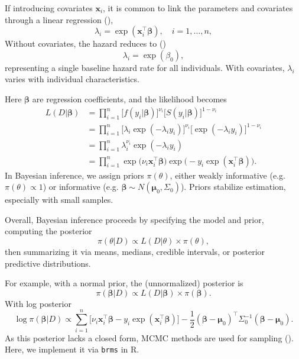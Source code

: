 If introducing covariates $\mathbf{x}_i$, it is common to link the parameters and covariates through a linear regression (\cite{ibrahim2013bayesian}),
$$
\lambda_i = \exp(\mathbf{x}_i^\top \boldsymbol{\beta}),
\quad i = 1, \ldots, n,
$$
Without covariates, the hazard reduces to (\cite{chen2025survival})
$$
\lambda_i = \exp(\beta_0),
$$
representing a single baseline hazard rate for all individuals. With covariates, $\lambda_i$ varies with individual characteristics.

Here $\boldsymbol{\beta}$ are regression coefficients, and the likelihood becomes
\begin{align*}
L(D | \boldsymbol{\beta})
&= \prod_{i=1}^n 
\big[ f(y_i | \boldsymbol{\beta}) \big]^{\nu_i}
\big[ S(y_i | \boldsymbol{\beta}) \big]^{1 - \nu_i} \\
&= \prod_{i=1}^n 
\big[ \lambda_i \exp(-\lambda_i y_i) \big]^{\nu_i}
\big[ \exp(-\lambda_i y_i) \big]^{1 - \nu_i} \\
&= \prod_{i=1}^n 
\lambda_i^{\nu_i} 
\exp(-\lambda_i y_i) \\
&= \prod_{i=1}^n 
\exp\big( \nu_i \mathbf{x}_i^\top \boldsymbol{\beta} \big)
\exp\big( - y_i \exp(\mathbf{x}_i^\top \boldsymbol{\beta}) \big).
\end{align*}
In Bayesian inference, we assign priors $\pi(\theta)$, either weakly informative (e.g. $\pi(\theta)\propto1$) or informative (e.g. $\boldsymbol{\beta} \sim N(\boldsymbol{\mu}_0, \Sigma_0)$). Priors stabilize estimation, especially with small samples.

Overall, Bayesian inference proceeds by specifying the model and prior, computing the posterior
$$
\pi(\theta | D)
\propto
L(D | \theta) \times \pi(\theta),
$$
then summarizing it via means, medians, credible intervals, or posterior predictive distributions.

For example, with a normal prior, the (unnormalized) posterior is
$$
\pi(\boldsymbol{\beta} | D)
\propto
L(D | \boldsymbol{\beta})
\times
\pi(\boldsymbol{\beta}).
$$
With log posterior
$$
\log \pi(\boldsymbol{\beta} | D)
\propto \sum_{i=1}^n
\big[ \nu_i \mathbf{x}_i^\top \boldsymbol{\beta}
- y_i \exp(\mathbf{x}_i^\top \boldsymbol{\beta}) \big]
- \frac{1}{2}
(\boldsymbol{\beta} - \boldsymbol{\mu}_0)^\top
\Sigma_0^{-1}
(\boldsymbol{\beta} - \boldsymbol{\mu}_0).
$$
As this posterior lacks a closed form, MCMC methods are used for sampling (\cite{stats5010006}). Here, we implement it via \texttt{brms} in R.




